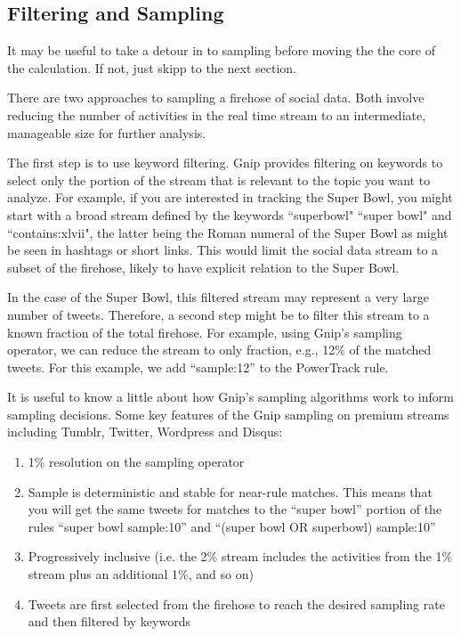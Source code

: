 \documentclass{article}
\begin{document}
\subsection{Filtering and Sampling} 

It may be useful to take a detour in to sampling before moving the the core of the calculation.  If not, just skipp to the next section.

There are two approaches to sampling a firehose of social data. Both involve reducing the number of activities in the real time stream to an intermediate, manageable size for further analysis.

The first step is to use keyword filtering.  Gnip provides filtering on keywords to select only the portion of the stream that is relevant to the topic you want to analyze. For example, if you are interested in tracking the Super Bowl, you might start with a broad stream defined by the keywords ``superbowl" ``super bowl" and ``contains:xlvii", the latter being the Roman numeral of the Super Bowl as might be seen in hashtags or short links. This would limit the social data stream to a subset of the firehose, likely to have explicit relation to the Super Bowl.

In the case of the Super Bowl, this filtered stream may represent a very large number of tweets.  Therefore, a second step might be to filter this stream to a known fraction of the total firehose. For example, using Gnip's sampling operator, we can reduce the stream to only fraction, e.g., 12\% of the matched tweets. For this example, we add ``sample:12'' to the PowerTrack rule.

It is useful to know a little about how Gnip's sampling algorithms work to inform sampling decisions.  Some key features of the Gnip sampling on premium streams including Tumblr, Twitter, Wordpress and Disqus:

\begin{enumerate}
	\item 1\% resolution on the sampling operator
	\item Sample is deterministic and stable for near-rule matches.  This means that you will get the same tweets for matches to the ``super bowl'' portion of the rules ``super bowl sample:10'' and ``(super bowl OR superbowl) sample:10''
	\item Progressively inclusive (i.e. the 2\% stream includes the activities from the 1\% stream plus an additional 1\%,  and so on)
	\item Tweets are first selected from the firehose to reach the desired sampling rate and then filtered by keywords 
\end{enumerate}
\end{document}
